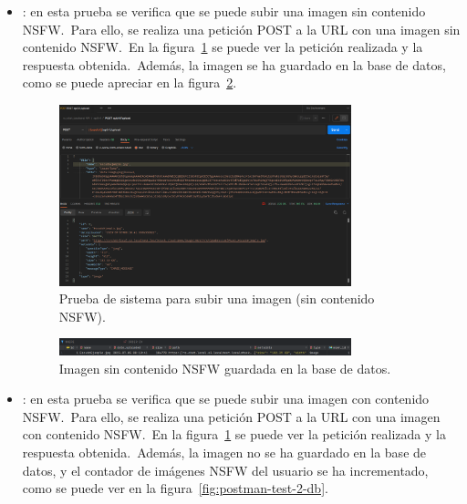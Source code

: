 \begin{itemize}
	\item {}: en esta prueba se verifica que se puede subir una imagen
	sin contenido NSFW.\ Para ello, se realiza una petición POST a la URL  con
	una imagen sin contenido NSFW.\ En la figura~\ref{fig:postman-test-1} se puede ver la petición
	realizada y la respuesta obtenida.\ Además, la imagen se ha guardado en la base de datos, como se puede apreciar
	en la figura~\ref{fig:postman-test-1-db}.

	\begin{figure}[H]
		\centering
		\includegraphics[width=0.8\textwidth]{res/images/postman-system-test-upload-image-no-nsfw}
		\caption{Prueba de sistema para subir una imagen (sin contenido NSFW).}
		\label{fig:postman-test-1}
	\end{figure}

	\begin{figure}[H]
		\centering
		\includegraphics[width=0.8\textwidth]{res/images/postman-system-test-upload-image-no-nsfw-db}
		\caption{Imagen sin contenido NSFW guardada en la base de datos.}
		\label{fig:postman-test-1-db}
	\end{figure}

	\item {}: en esta prueba se verifica que  se puede
	subir una imagen con contenido NSFW.\ Para ello, se realiza una petición POST a la URL
	 con una imagen con contenido NSFW.\ En la figura~\ref{fig:postman-test-1} se
	puede ver la petición realizada y la respuesta obtenida.\ Además, la imagen no se ha guardado en la base de datos,
	y el contador de imágenes NSFW del usuario se ha incrementado, como se puede ver en la
	figura~\ref{fig:postman-test-2-db}.


\end{itemize}

